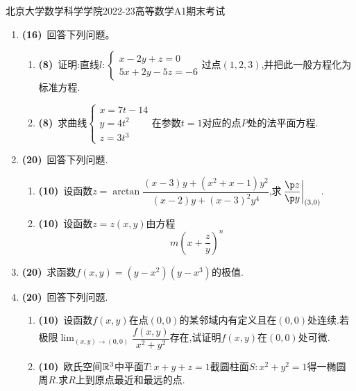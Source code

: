 \documentclass{ctexart}
\begin{document}
\pagestyle{empty}

\begin{center}\Large
    北京大学数学科学学院2022-23高等数学A1期末考试
\end{center}
\begin{enumerate}[leftmargin=*,label=\textbf{\arabic*.}]
    \item \textbf{(16)}\ 回答下列问题。
        \begin{enumerate}[label=\tbf{(\arabic*)}]
            \item \textbf{(8)}\ 证明:直线$l:\left\{\begin{array}{l}
                    x-2y+z=0\\
                    5x+2y-5z=-6
                \end{array}\right.$过点$(1,2,3)$,并把此一般方程化为标准方程.
            \item \textbf{(8)}\ 求曲线$\left\{\begin{array}{l}
                    x=7t-14\\
                    y=4t^2\\
                    z=3t^3    
                \end{array}\right.$在参数$t=1$对应的点$P$处的法平面方程.
        \end{enumerate}
    \item \textbf{(20)}\ 回答下列问题.
        \begin{enumerate}[label=\tbf{(\arabic*)}]
            \item \textbf{(10)}\ 设函数$z=\arctan\dfrac{(x-3)y+(x^2+x-1)y^2}{(x-2)y+(x-3)^2y^4}$,求$\left.\dfrac{\p z}{\p y}\right|_{(3,0)}$.
            \item \textbf{(10)}\ 设函数$z=z(x,y)$由方程\[m\left(x+\dfrac zy\right)^n\]
        \end{enumerate}
    \item \textbf{(20)}\ 求函数$f(x,y)=\left(y-x^2\right)\left(y-x^3\right)$的极值.
    \item \textbf{(20)}\ 回答下列问题.
        \begin{enumerate}[label=\tbf{(\arabic*)}]
            \item \textbf{(10)}\ 设函数$f(x,y)$在点$(0,0)$的某邻域内有定义且在$(0,0)$处连续.若极限$\displaystyle\lim_{(x,y)\to(0,0)}\dfrac{f(x,y)}{x^2+y^2}$存在,试证明$f(x,y)$在$(0,0)$处可微.
            \item \textbf{(10)}\ 欧氏空间$\mathbb{R}^3$中平面$T:x+y+z=1$截圆柱面$S:x^2+y^2=1$得一椭圆周$R$.求$R$上到原点最近和最远的点.

\end{enumerate}
\end{enumerate}
\end{document}
